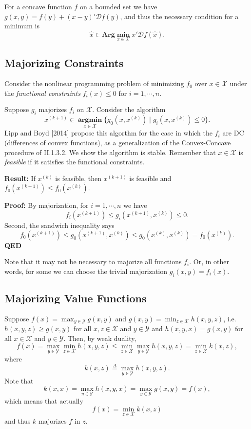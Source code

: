 \documentclass[
  12pt,
]{book}
\begin{document}
For a concave function \(f\) on a bounded set we
have \(g(x,y)=f(y)+(x-y)'\mathcal{D}f(y)\), and thus
the necessary condition for a minimum is
\[
\hat x\in\mathbf{Arg}\mathop{\mathbf{min}}\limits_{x\in\mathcal{X}}x'\mathcal{D}f(\hat x).
\]

\hypertarget{majorizing-constraints}{%
\subsection{Majorizing Constraints}\label{majorizing-constraints}}

Consider the nonlinear programming problem of minimizing \(f_0\) over \(x\in\mathcal{X}\)
under the \emph{functional constraints} \(f_i(x)\leq 0\) for \(i=1,\cdots,n\).

Suppose \(g_i\) majorizes \(f_i\) on \(\mathcal{X}\). Consider the algorithm
\[
x^{(k+1)}\in\mathop{\mathbf{argmin}}\limits_{x\in\mathcal{X}}\{g_0(x,x^{(k)})\mid g_i(x,x^{(k)})\leq 0\}.
\]
Lipp and Boyd {[}2014{]} propose this algorthm for the case in which
the \(f_i\) are DC (differences of convex functions), as a generalization of the Convex-Concave procedure of II.1.3.2. We show the algorithm is stable. Remember that \(x\in\mathcal{X}\) is \emph{feasible} if it satisfies the functional constraints.

\textbf{Result:}
If \(x^{(k)}\) is feasible, then \(x^{(k+1)}\) is feasible
and \(f_0(x^{(k+1)})\leq f_0(x^{(k)})\).

\textbf{Proof:}
By majorization, for \(i=1,\cdots,n\) we have
\[
f_i(x^{(k+1)})\leq
g_i(x^{(k+1)},x^{(k)})\leq 0.
\]
Second, the sandwich inequality says
\[
f_0(x^{(k+1)})\leq g_0(x^{(k+1)},x^{(k)})\leq g_0(x^{(k)},x^{(k)})=f_0(x^{(k)}).
\]
\textbf{QED}

Note that it may not be necessary to majorize all functions \(f_i\). Or, in other words, for some we can choose the trivial majorization \(g_i(x,y)=f_i(x)\).

\hypertarget{majorizing-value-functions}{%
\subsection{Majorizing Value Functions}\label{majorizing-value-functions}}

Suppose \(f(x)=\max_{y\in\mathcal{Y}} g(x,y)\)
and \(g(x,y)=\min_{z\in\mathcal{X}} h(x,y,z)\),
i.e.~\(h(x,y,z)\geq g(x,y)\) for all \(x,z\in\mathcal{X}\) and \(y\in\mathcal{Y}\)
and \(h(x,y,x)=g(x,y)\) for all \(x\in\mathcal{X}\)
and \(y\in\mathcal{Y}\). Then, by weak duality,
\[
f(x)=\max_{y\in\mathcal{Y}}\min_{z\in\mathcal{X}} h(x,y,z)\leq\min_{z\in\mathcal{X}}\max_{y\in\mathcal{Y}}
h(x,y,z)=\min_{z\in\mathcal{X}} k(x,z),
\]
where
\[
k(x,z)\mathop{=}\limits^{\Delta}\max_{y\in\mathcal{Y}}h(x,y,z).
\]
Note that
\[
k(x,x)=\max_{y\in\mathcal{Y}}h(x,y,x)=\max_{y\in\mathcal{Y}}g(x,y)=f(x),
\]
which means that actually
\[
f(x)=\min_{z\in\mathcal{X}} k(x,z)
\]
and thus \(k\) majorizes \(f\) in \(z\).
\end{document}
